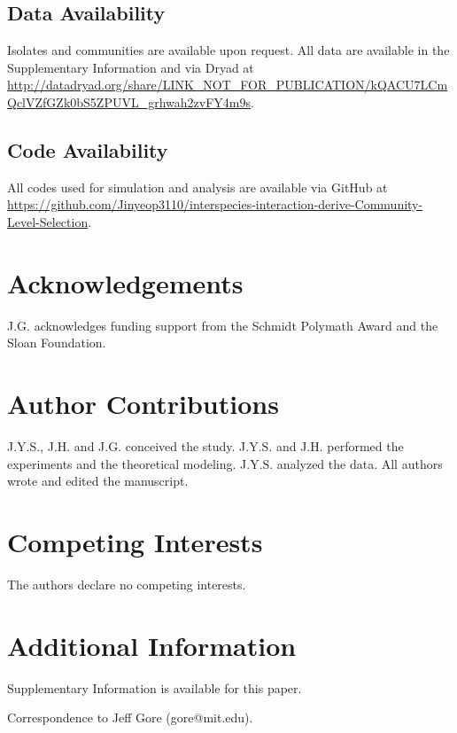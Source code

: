 \subsection*{Data Availability}
\label{sec:methods:data}

Isolates and communities are available upon request. All data are available in the Supplementary Information and via Dryad at \url{http://datadryad.org/share/LINK_NOT_FOR_PUBLICATION/kQACU7LCmQclVZfGZk0bS5ZPUVL_grhwah2zvFY4m9s}.


\subsection*{Code Availability}
\label{sec:methods:code}

All codes used for simulation and analysis are available via GitHub at \url{https://github.com/Jinyeop3110/interspecies-interaction-derive-Community-Level-Selection}.



\section*{Acknowledgements}
\label{sec:acknowledgements}

J.G. acknowledges funding support from the Schmidt Polymath Award and the Sloan Foundation.


\section*{Author Contributions}
\label{sec:contributions}

J.Y.S., J.H. and J.G. conceived the study. J.Y.S. and J.H. performed the experiments and the theoretical modeling. J.Y.S. analyzed the data. All authors wrote and edited the manuscript.


\section*{Competing Interests}
\label{sec:competing}

The authors declare no competing interests.


\section*{Additional Information}
\label{sec:additional}

Supplementary Information is available for this paper.

\noindent Correspondence to Jeff Gore (gore@mit.edu).
